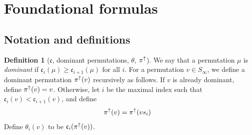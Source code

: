\documentclass{amsart}
\newtheorem{theorem}[lemma]{Theorem}
\theoremstyle{definition}
\newtheorem{definition}[lemma]{Definition}
\theoremstyle{remark}
\numberwithin{equation}{section}
\DeclareMathOperator{\sch}{\mathfrak{S}}
\DeclareMathOperator{\qsch}{\widetilde{\mathfrak{S}}}
\newcommand{\tom}[1]{\ensuremath{\xrightarrow{#1}}}
\newcommand{\fx}{\mathrm{fix}}
\newcommand{\code}{\mathfrak{c}}
\begin{document}








\section{Foundational formulas} \label{sec:foundations}

\subsection{Notation and definitions}

\begin{definition}[$\code$, dominant permutations, $\theta$, $\pi^\uparrow$] \label{def:codetheta}
We say that a permutation $\mu$ is \emph{dominant} if $\code_i(\mu)\geq \code_{i+1}(\mu)$ for all $i$. For a permutation $v\in S_\infty$, we define a dominant permutation $\pi^\uparrow(v)$ recursively as follows. If $v$ is already dominant, define $\pi^\uparrow(v)=v$. Otherwise, let $i$ be the maximal index such that $\code_i(v)<\code_{i+1}(v)$, and define
$$\pi^\uparrow(v)=\pi^\uparrow(vs_i)$$
Define $\theta_i(v)$ to be $\code_i(\dom(v))$.
\end{definition}
\end{document}
